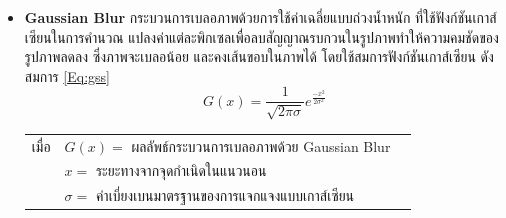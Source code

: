 \documentclass[12pt,oneside,openright,a4paper]{cpe-thai-project}
\begin{document}
\begin{itemize}

\item\textbf {Gaussian Blur}
กระบวนการเบลอภาพด้วยการใช้ค่าเฉลี่ยแบบถ่วงน้ำหนัก ที่ใช้ฟังก์ชันเกาส์เซียนในการคำนวณ แปลงค่าแต่ละพิกเซลเพื่อลบสัญญาณรบกวนในรูปภาพทำให้ความคมชัดของรูปภาพลดลง ซึ่งภาพจะเบลอน้อย และคงเส้นขอบในภาพได้ โดยใช้สมการฟังก์ชันเกาส์เซียน \cite{18} ดังสมการ \ref{Eq:gss}
\begin{equation}
	G(x) = \frac{1}{\sqrt{2\pi\sigma} } e^{\frac{-x^2}{2\sigma^2}} \label{Eq:gss}
\end{equation}
\hspace*{5mm}
\begin{tabular}{l@{ }l@{ }l}
  เมื่อ   & $G(x) =$ ผลลัพธ์กระบวนการเบลอภาพด้วย Gaussian Blur \\
        & $x =$ ระยะทางจากจุดกำเนิดในแนวนอน  \\
        & $\sigma =$ ค่าเบี่ยงเบนมาตรฐานของการแจกแจงแบบเกาส์เซียน
\end{tabular}


\end{itemize}
\end{document}

